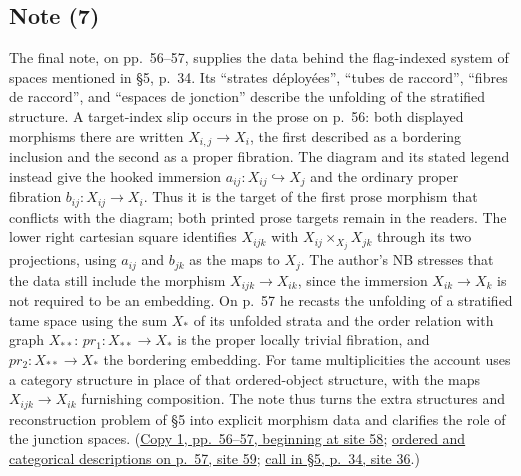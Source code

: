 \documentclass[11pt,a4paper]{article}
\begin{document}
\subsection*{Note (7)}
The final note, on pp.~56--57, supplies the data behind the flag-indexed
system of spaces mentioned in \S5, p.~34. Its ``strates déployées'',
``tubes de raccord'', ``fibres de raccord'', and ``espaces de jonction''
describe the unfolding of the stratified structure. A target-index slip
occurs in the prose on p.~56: both displayed morphisms there are written
$X_{i,j}\longrightarrow X_i$, the first described as a bordering inclusion
and the second as a proper fibration. The diagram and its stated legend
instead give the hooked immersion
$a_{ij}:X_{ij}\hookrightarrow X_j$ and the ordinary proper fibration
$b_{ij}:X_{ij}\longrightarrow X_i$. Thus it is the target of the first
prose morphism that conflicts with the diagram; both printed prose
targets remain in the readers. The lower right cartesian square identifies
$X_{ijk}$ with $X_{ij}\times_{X_j}X_{jk}$ through its two projections,
using $a_{ij}$ and $b_{jk}$ as the maps to $X_j$. The author's NB stresses
that the data still include the morphism
$X_{ijk}\longrightarrow X_{ik}$, since the immersion
$X_{ik}\longrightarrow X_k$ is not required to be an embedding. On p.~57
he recasts the unfolding of a stratified tame space using the sum $X_*$
of its unfolded strata and the order relation with graph $X_{**}$:
$pr_1:X_{**}\longrightarrow X_*$ is the proper locally trivial fibration,
and $pr_2:X_{**}\longrightarrow X_*$ the bordering embedding. For tame
multiplicities the account uses a category structure in place of that
ordered-object structure, with the maps
$X_{ijk}\longrightarrow X_{ik}$ furnishing composition. The note thus
turns the extra structures and reconstruction problem of \S5 into
explicit morphism data and clarifies the role of the junction spaces.
(\href{https://grothendieck.umontpellier.fr/web/viewer.html?file=../119.pdf\#page=59}{Copy 1, pp.~56--57, beginning at site 58};
\href{https://grothendieck.umontpellier.fr/web/viewer.html?file=../119.pdf\#page=60}{ordered and categorical descriptions on p.~57, site 59};
\href{https://grothendieck.umontpellier.fr/web/viewer.html?file=../119.pdf\#page=37}{call in \S5, p.~34, site 36}.)
\end{document}
